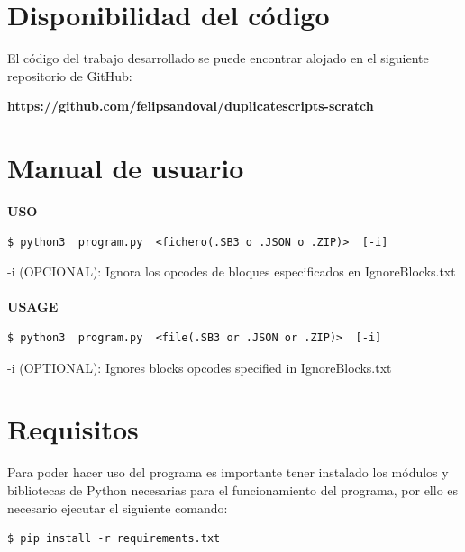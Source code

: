 \documentclass[a4paper, 12pt]{book}
\begin{document}

\cleardoublepage
\appendix
\chapter{Disponibilidad del código}
\label{app:codigo}

El código del trabajo desarrollado se puede encontrar alojado en el siguiente repositorio de GitHub:

\textbf{https://github.com/felipsandoval/duplicatescripts-scratch}

\chapter{Manual de usuario}
\label{app:manual}


\textbf{USO}
\begin{lstlisting}[style=consola,numbers=none]
$ python3  program.py  <fichero(.SB3 o .JSON o .ZIP)>  [-i]
\end{lstlisting}

-i (OPCIONAL): Ignora los opcodes de bloques especificados en IgnoreBlocks.txt
\\\\
\textbf{USAGE}
\begin{lstlisting}[style=consola,numbers=none]
$ python3  program.py  <file(.SB3 or .JSON or .ZIP)>  [-i]
\end{lstlisting}

-i (OPTIONAL): Ignores blocks opcodes specified in IgnoreBlocks.txt

\chapter{Requisitos}
\label{app:requisitos}

Para poder hacer uso del programa es importante tener instalado los módulos y bibliotecas de Python necesarias para el funcionamiento del programa,  por ello es necesario ejecutar el siguiente comando:

\begin{lstlisting}[style=consola,numbers=none]
$ pip install -r requirements.txt
\end{lstlisting}
\end{document}
